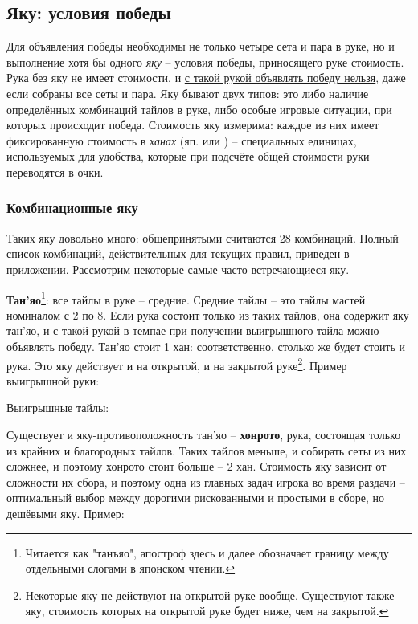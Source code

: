 \subsection{Яку: условия победы}

Для объявления победы необходимы не только четыре сета и пара в руке, но и выполнение хотя бы одного \textit{яку} – условия победы, приносящего руке стоимость. Рука без яку не имеет стоимости, и \underline{с такой рукой объявлять победу нельзя}, даже если собраны все сеты и пара. Яку бывают двух типов: это либо наличие определённых комбинаций тайлов в руке, либо особые игровые ситуации, при которых происходит победа. Стоимость яку измерима: каждое из них имеет фиксированную стоимость в \textit{ханах} (яп.  или ) – специальных единицах, используемых для удобства, которые при подсчёте общей стоимости руки переводятся в очки.

\subsubsection{Комбинационные яку}

Таких яку довольно много: общепринятыми считаются 28 комбинаций. Полный список комбинаций, действительных для текущих правил, приведен в приложении. Рассмотрим некоторые самые часто встречающиеся яку.

\textbf{Тан'яо}\footnote{Читается как "танъяо", апостроф здесь и далее обозначает границу между отдельными слогами в японском чтении.}: все тайлы в руке – средние. Средние тайлы – это тайлы мастей номиналом с 2 по 8. Если рука состоит только из таких тайлов, она содержит яку тан'яо, и с такой рукой в темпае при получении выигрышного тайла можно объявлять победу. Тан'яо стоит 1 хан: соответственно, столько же будет стоить и рука. Это яку действует и на открытой, и на закрытой руке\footnote{Некоторые яку не действуют на открытой руке вообще. Существуют также яку, стоимость которых на открытой руке будет ниже, чем на закрытой.}. Пример выигрышной руки:

\hfill {}

Выигрышные тайлы: 

Существует и яку-противоположность тан'яо – \textbf{хонрото}, рука, состоящая только из крайних и благородных тайлов. Таких тайлов меньше, и собирать сеты из них сложнее, и поэтому хонрото стоит больше – 2 хан. Стоимость яку зависит от сложности их сбора, и поэтому одна из главных задач игрока во время раздачи – оптимальный выбор между дорогими рискованными и простыми в сборе, но дешёвыми яку. Пример:

